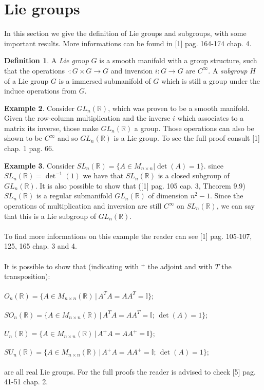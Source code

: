 \documentclass[12pt,a4paper]{report}
\theoremstyle{definition}
\newtheorem{Def}{Definition}[chapter]
\theoremstyle{Theorem}
\theoremstyle{definition}
\newtheorem{Ex}[Def]{Example}
\theoremstyle{definition}
\begin{document}
	\section{Lie groups}
	In this section we give the definition of Lie groups and subgroups, with some important results. More informations can be found in [1] pag. 164-174 chap. 4.
	\begin{Def}
		A \textit{Lie group} $G$ is a smooth manifold with a group structure, such that the operations $\cdot:G\times G\rightarrow G$ and inversion $i:G\rightarrow G$ are $C^\infty$.
		A \textit{subgroup} $H$ of a Lie group $G$ is a immersed submanifold of $G$ which is still a group under the induce operations from $G$.
	\end{Def}
	\begin{Ex}
		Consider $GL_n(\mathbb{R})$, which was proven to be a smooth manifold. Given the row-column multiplication and the inverse $i$ which associates to a matrix its inverse, those make $GL_n(\mathbb{R})$ a group. Those operations can also be shown to be $C^\infty$ and so $GL_n(\mathbb{R})$ is a Lie group. To see the full proof consult [1] chap. 1 pag. 66.
	\end{Ex}
	\begin{Ex}
		Consider $SL_n(\mathbb{R})=\{A\in M_{n\times n}| \det(A)=1\}$. since $SL_n(\mathbb{R})=\det^{-1}(1)$ we have that $SL_n(\mathbb{R})$ is a closed subgroup of $GL_n(\mathbb{R})$. It is also possible to show that ([1] pag. 105 cap. 3, Theorem 9.9) $SL_n(\mathbb{R})$ is a regular submanifold $GL_n(\mathbb{R})$ of dimension $n^2-1$. Since the operations of multiplication and inversion are still $C^\infty$ on $SL_n(\mathbb{R})$, we can say that this is a Lie subgroup of $GL_n(\mathbb{R})$.\\
		\\
		To find more informations on this example the reader can see [1] pag. 105-107, 125, 165 chap. 3 and 4.\\
		\\
		It is possible to show that (indicating with $^+$ the adjoint and with $T$ the transposition):\\\\
		$O_n(\mathbb{R})=\{A\in M_{n\times n}(\mathbb{R})\, |\, A^TA=AA^T=\mathbb{I}\};$\\\\
		$SO_n(\mathbb{R})=\{A\in M_{n\times n}(\mathbb{R})\, |\, A^TA=AA^T=\mathbb{I};\, \det(A)=1\};$\\\\
		$U_n(\mathbb{R})=\{A\in M_{n\times n}(\mathbb{R})\, |\, A^+A=AA^+=\mathbb{I}\};$\\\\
		$SU_n(\mathbb{R})=\{A\in M_{n\times n}(\mathbb{R})\, |\, A^+A=AA^+=\mathbb{I};\,\det(A)=1\};$\\\\
		are all real Lie groups. 
		For the full proofs the reader is advised to check [5] pag. 41-51 chap. 2.
	\end{Ex}
\end{document}
